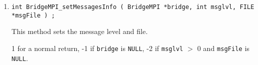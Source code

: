 \begin{enumerate}
\begin{center}
\begin{tabular}{ll}
\end{tabular}
\end{center}
\item
\begin{verbatim}
int BridgeMPI_setMessagesInfo ( BridgeMPI *bridge, int msglvl, FILE *msgFile ) ;
\end{verbatim}
This method sets the message level and file.
\par {}
1 for a  normal return,
-1 if \texttt{bridge} is \texttt{NULL},
-2 if \texttt{msglvl} $>$ 0 and \texttt{msgFile} is \texttt{NULL}.
\end{enumerate}
\par

